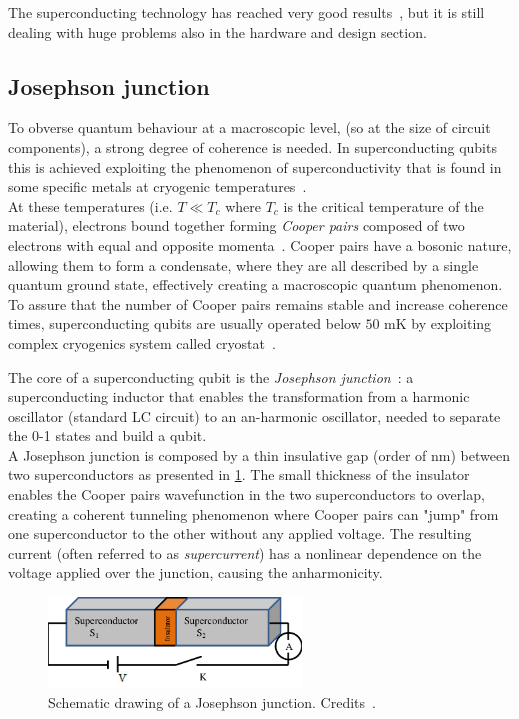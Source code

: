 The superconducting technology has reached very good results~\cite{Arute2019}, but it is still dealing with huge problems also in the hardware and design section.

\subsection{Josephson junction}

To obverse quantum behaviour at a macroscopic level, (so at the size of circuit components), a strong degree of coherence is needed.
In superconducting qubits this is achieved exploiting the phenomenon of superconductivity that is found in some specific metals at cryogenic temperatures~\cite{Tinkham2004}.\\
At these temperatures (i.e. $T\ll T_c$ where $T_c$ is the critical temperature of the material), electrons bound together forming \textit{Cooper pairs} composed of two electrons with equal and opposite momenta~\cite{Langford2013}.
Cooper pairs have a bosonic nature, allowing them to form a condensate, where they are all described by a single quantum ground state, effectively creating a macroscopic quantum phenomenon.
To assure that the number of Cooper pairs remains stable and increase coherence times, superconducting qubits are usually operated below $50$ mK by exploiting complex cryogenics system called cryostat~\cite{Pobell2007}.

The core of a superconducting qubit is the \textit{Josephson junction}~\cite{Kockum2019}: a superconducting inductor that enables the transformation from a harmonic oscillator (standard LC circuit) to an an-harmonic oscillator, needed to separate the 0-1 states and build a qubit.\\
A Josephson junction is composed by a thin insulative gap (order of nm) between two superconductors as presented in \cref{fig:junction}.
The small thickness of the insulator enables the Cooper pairs wavefunction in the two superconductors to overlap, creating a coherent tunneling phenomenon where Cooper pairs can "jump" from one superconductor to the other without any applied voltage.
The resulting current (often referred to as \textit{supercurrent}) has a nonlinear dependence on the voltage applied over the junction, causing the anharmonicity.

\begin{figure}[ht]
    \centering
    \includegraphics[width=0.6\textwidth]{Theory/figures/josephson_junction.png}
    \caption[Schematic drawing of a Josephson junction]{Schematic drawing of a Josephson junction. Credits~\cite{Vool2017}.}
    \label{fig:junction}
\end{figure}

